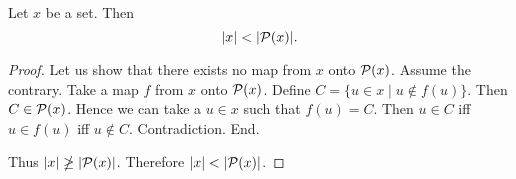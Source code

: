 \documentclass[../set-theory.tex]{subfiles}
\begin{document}
  \begin{forthel}
    \begin{theorem}[Cantor]
      Let $x$ be a set.
      Then \[ |x| < |\mathcal{P}(x)|. \]
    \end{theorem}
    \begin{proof}
      Let us show that there exists no map from $x$ onto $\mathcal{P}(x)$.
        Assume the contrary.
        Take a map $f$ from $x$ onto $\mathcal{P}(x)$.
        Define $C = \{ u \in x \mid u \notin f(u) \}$.
        Then $C \in \mathcal{P}(x)$.
        Hence we can take a $u \in x$ such that $f(u) = C$.
        Then $u \in C$ iff $u \in f(u)$ iff $u \notin C$.
        Contradiction.
      End.

      Thus $|x| \ngeq |\mathcal{P}(x)|$.
      Therefore $|x| < |\mathcal{P}(x)|$.
    \end{proof}
  \end{forthel}
\end{document}
